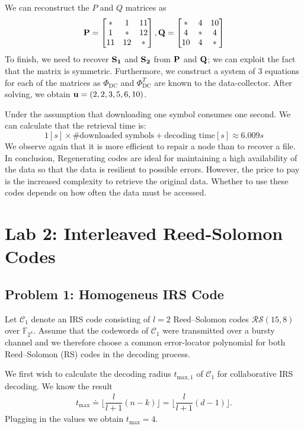 \documentclass{article}
\begin{document}
We can reconstruct the $P$ and $Q$ matrices as
\begin{equation*}
\vb{P}=
\begin{bmatrix}
* & 1 & 11 \\
1 & * & 12 \\
11 & 12 & *
\end{bmatrix},
\vb{Q}=
\begin{bmatrix}
* & 4 & 10 \\
4 & * & 4 \\
10 & 4 & *
\end{bmatrix}
\end{equation*}
To finish, we need to recover $\vb{S_1}$ and $\vb{S_2}$ from $\vb{P}$ and $\vb{Q}$; we can exploit the fact that the matrix is symmetric. Furthermore, we construct a system of 3 equations for each of the matrices as $\Phi_{\text{DC}}$ and $\Phi_{\text{DC}}^T$ are known to the data-collector. After solving, we obtain $\vb{u} = (2, 2, 3, 5, 6, 10)$.

Under the assumption that downloading one symbol consumes one second. We can calculate that the retrieval time is:
\begin{equation*}
1[s] \times \text{\#downloaded symbols} + \text{decoding time}[s] \approx 6.009s
\end{equation*}
We observe again that it is more efficient to repair a node than to recover a file. In conclusion, Regenerating codes are ideal for maintaining a high availability of the data so that the data is resilient to possible errors. However, the price to pay is the increased complexity to retrieve the original data. Whether to use these codes depends on how often the data must be accessed.
\section*{Lab 2: Interleaved Reed-Solomon Codes}
\subsection*{Problem 1: Homogeneus IRS Code}
Let $\mathcal{C}_1$ denote an IRS code consisting of $l = 2$ Reed–Solomon codes $\mathcal{RS}(15, 8)$ over $\mathbb{F}_{2^4}$.
Assume that the codewords of $\mathcal{C}_1$ were transmitted over a bursty channel and we therefore choose a common error-locator polynomial for both Reed–Solomon (RS) codes in the decoding process.

We first wish to calculate the decoding radius $t_{\text{max},1}$ of $\mathcal{C}_1$ for collaborative IRS decoding. We know the result
\begin{align*}
t_{\text{max}} \doteq \lfloor \dfrac{l}{l+1}(n-k) \rfloor = \lfloor \dfrac{l}{l+1}(d-1) \rfloor.
\end{align*}
Plugging in the values we obtain $t_{\text{max}} = 4$.
\end{document}

